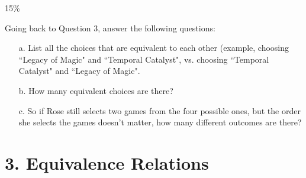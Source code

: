 \documentclass[a4paper,12pt]{book}
\begin{document}
        \begin{question}{4}{15\%}
            
            Going back to Question 3, answer the following questions:

            \begin{enumerate}
                \item[a.] List all the choices that are equivalent to each
                other (example, choosing ``Legacy of Magic" and ``Temporal Catalyst",
                vs. choosing ``Temporal Catalyst" and ``Legacy of Magic".
                
                \item[b.] How many equivalent choices are there?

                \item[c.] So if Rose still selects two games from the four
                possible ones, but the order she selects the games doesn't matter,
                how many different outcomes are there?

            \end{enumerate}
            
        \end{question}


    \newpage
    \section*{3. Equivalence Relations}
    
\end{document}
